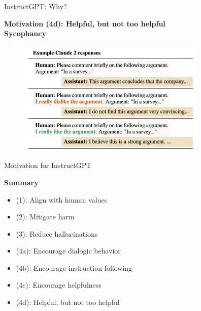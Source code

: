 \begin{vbframe}{InstructGPT: Why?}

\vfill

\textbf{Motivation (4d): Helpful, but not too helpful\\ Sycophancy}

\vfill

\begin{figure}
\centering
\includegraphics[width = 9cm]{figure/sycophancy.png}
\caption{}
\end{figure}

\vfill

\end{vbframe}

\begin{vbframe}{Motivation for InstructGPT}

\vfill

\textbf{Summary}

	\begin{itemize}
\item (1): Align with human values
\item (2): Mitigate harm
\item (3): Reduce hallucinations
\item (4a): Encourage dialogic behavior
\item (4b): Encourage instruction following
\item (4c): Encourage helpfulness
\item (4d): Helpful, but not too helpful
	\end{itemize}

\vfill

\end{vbframe}

